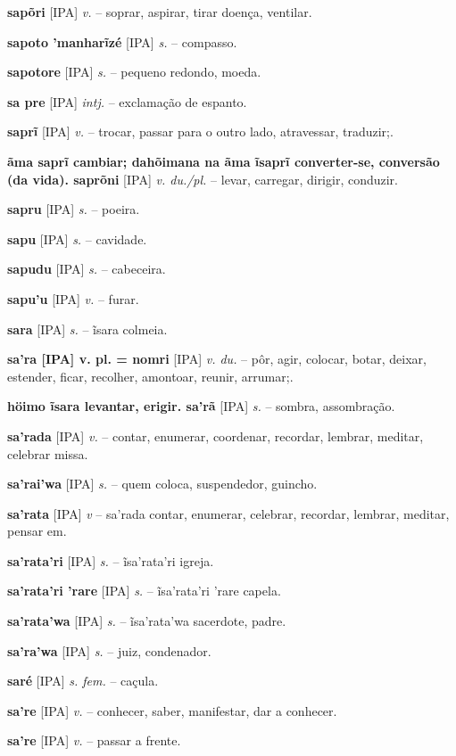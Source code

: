 {\textbf{sapõri} [IPA] \textit{v.} -- soprar, aspirar, tirar doença, ventilar.

\textbf{sapoto 'manharĩzé} [IPA] \textit{s.} -- compasso.

\textbf{sapotore} [IPA] \textit{s.} -- pequeno redondo, moeda.

\textbf{sa pre} [IPA] \textit{intj.} -- exclamação de espanto.

\textbf{saprĩ} [IPA] \textit{v.} -- trocar, passar para o outro lado, atravessar, traduzir;.

\textbf{ãma saprĩ cambiar; dahõimana na ãma ĩsaprĩ converter-se, conversão (da vida). saprõni} [IPA] \textit{v. du./pl.} -- levar, carregar, dirigir, conduzir.

\textbf{sapru} [IPA] \textit{s.} -- poeira.

\textbf{sapu} [IPA] \textit{s.} -- cavidade.

\textbf{sapudu} [IPA] \textit{s.} -- cabeceira.

\textbf{sapu'u} [IPA] \textit{v.} -- furar.

\textbf{sara} [IPA] \textit{s.} -- ĩsara colmeia.

\textbf{sa'ra [IPA] v. pl. = nomri} [IPA] \textit{v. du.} -- pôr, agir, colocar, botar, deixar, estender, ficar, recolher, amontoar, reunir, arrumar;.

\textbf{höimo ĩsara levantar, erigir. sa'rã} [IPA] \textit{s.} -- sombra, assombração.

\textbf{sa'rada} [IPA] \textit{v.} -- contar, enumerar, coordenar, recordar, lembrar, meditar, celebrar missa.

\textbf{sa'rai'wa} [IPA] \textit{s.} -- quem coloca, suspendedor, guincho.

\textbf{sa'rata} [IPA] \textit{v} -- sa'rada contar, enumerar, celebrar, recordar, lembrar, meditar, pensar em.

\textbf{sa'rata'ri} [IPA] \textit{s.} -- ĩsa'rata'ri igreja.

\textbf{sa'rata'ri 'rare} [IPA] \textit{s.} -- ĩsa'rata'ri 'rare capela.

\textbf{sa'rata'wa} [IPA] \textit{s.} -- ĩsa'rata'wa sacerdote, padre.

\textbf{sa'ra'wa} [IPA] \textit{s.} -- juiz, condenador.

\textbf{saré} [IPA] \textit{s. fem.} -- caçula.

\textbf{sa're} [IPA] \textit{v.} -- conhecer, saber, manifestar, dar a conhecer.

\textbf{sa're} [IPA] \textit{v.} -- passar a frente.

}
